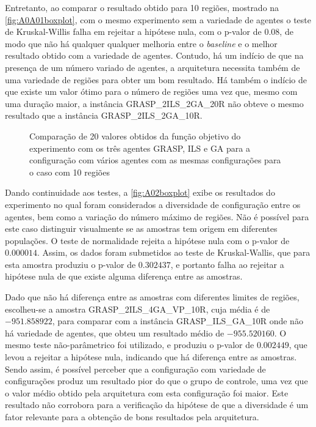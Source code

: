 Entretanto, ao comparar o resultado obtido para 10 regiões, mostrado na \autoref{fig:A0A01boxplot}, com o mesmo experimento sem a variedade de agentes o teste de Kruskal-Willis falha em rejeitar a hipótese nula, com o p-valor de $0.08$, de modo que não há qualquer qualquer melhoria entre o \textit{baseline} e o melhor resultado obtido com a variedade de agentes. Contudo, há um indício de que na presença de um número variado de agentes, a arquitetura necessita também de uma variedade de regiões para obter um bom resultado. Há também o indício de que existe um valor ótimo para o número de regiões uma vez que, mesmo com uma duração maior, a instância GRASP\_2ILS\_2GA\_20R não obteve o mesmo resultado que a instância  GRASP\_2ILS\_2GA\_10R.

\begin{figure}
    \centering
    \caption{Comparação de 20 valores obtidos da função objetivo do experimento com os três agentes GRASP, ILS e GA para a configuração com vários agentes com as mesmas configurações para o caso com 10 regiões}
    
    \label{fig:A0A01boxplot}
\end{figure}

Dando continuidade aos testes, a \autoref{fig:A02boxplot} exibe os resultados do experimento no qual foram considerados a diversidade de configuração entre os agentes, bem como a variação do número máximo de regiões. Não é possível para este caso distinguir visualmente se as amostras tem origem em diferentes populações. O teste de normalidade rejeita a hipótese nula com o p-valor de $0.000014$. Assim, os dados foram submetidos ao teste de Kruskal-Wallis, que  para esta amostra produziu o p-valor de $0.302437$, e portanto falha ao rejeitar a hipótese nula de que existe alguma diferença entre as amostras. 

Dado que não há diferença entre as amostras com diferentes limites de regiões, escolheu-se a amostra GRASP\_2ILS\_4GA\_VP\_10R, cuja média é de $-951.858922$, para comparar com a instância GRASP\_ILS\_GA\_10R onde não há variedade de agentes, que obteu um resultado médio de $-955.520160$. O mesmo teste não-parâmetrico foi utilizado, e produziu o p-valor de $0.002449$, que levou a rejeitar a hipótese nula, indicando que há diferença entre as amostras. Sendo assim, é possível perceber que a configuração com variedade de configurações produz um resultado pior do que o grupo de controle, uma vez que o valor médio obtido pela arquitetura com esta configuração foi maior. Este resultado não corrobora para a verificação da hipótese de que a diversidade é um fator relevante para a obtenção de bons resultados pela arquitetura. 

